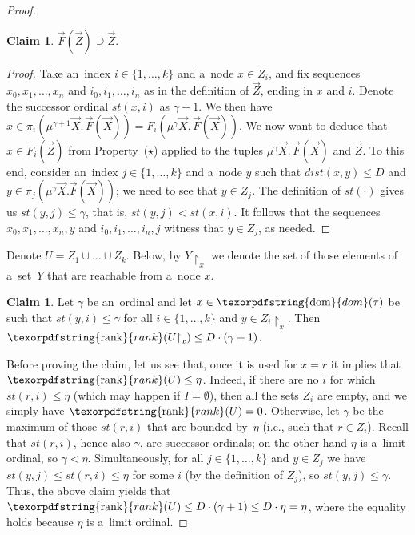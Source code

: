 \documentclass[11pt,a4paper]{amsart}
\theoremstyle{plain}
\theoremstyle{definition}
\newtheorem{clm}[thm]{Claim}
\theoremstyle{defC}
\theoremstyle{thmC}
\theoremstyle{plain}
\numberwithin{equation}{section}
\numberwithin{equation}{section}
\numberwithin{figure}{section}
\newcommand{\ident}[1]{\ensuremath{\texorpdfstring{\mathrm{\mathnm{#1}}}{#1}}\xspace}
\newcommand{\dom}{\ident{dom}}
\newcommand{\mathnm}[1]{#1}
\newcommand{\restr}{{\upharpoonright}}
\newcommand{\rank}{\ident{rank}}
\newcommand{\dist}{\mathit{dist}}
\newcommand{\stab}{\mathit{st}}
\begin{document}
\begin{proof}
	\begin{clm}
		$\vec{F}(\vec{Z})\supseteq\vec{Z}$.
	\end{clm}

	\begin{proof}
		Take an~index $i\in\{1,\dots,k\}$ and a~node $x\in Z_i$, and fix sequences $x_0,x_1,\dots,x_n$ and $i_0,i_1,\dots,i_n$ as in the definition of $\vec{Z}$, ending in $x$ and $i$.
		Denote the successor ordinal $\stab(x,i)$ as $\gamma+1$.
		We then have $x\in\pi_i(\mu^{\gamma+1}\vec{X}.\,\vec{F}(\vec{X}))=F_i(\mu^\gamma\vec{X}.\,\vec{F}(\vec{X}))$.
		We now want to deduce that $x\in F_i(\vec{Z})$ from Property~($\star$) applied to the tuples $\mu^\gamma\vec{X}.\,\vec{F}(\vec{X})$ and $\vec{Z}$.
		To this end, consider an~index $j\in\{1,\dots,k\}$ and a~node $y$ such that $\dist(x,y)\leq D$ and $y\in\pi_j(\mu^\gamma\vec{X}.\vec{F}(\vec{X}))$;
		we need to see that $y\in Z_j$.
		The definition of $\stab(\cdot)$ gives us $\stab(y,j)\leq\gamma$, that is, $\stab(y,j)<\stab(x,i)$.
		It follows that the sequences $x_0,x_1,\dots,x_n,y$ and $i_0,i_1,\dots,i_n,j$ witness that $y\in Z_j$, as needed.
	\end{proof}
	
	Denote $U=Z_1\cup\dots\cup Z_k$.
	Below, by $Y\restr_x$ we denote the set of those elements of a~set~$Y$ that are reachable from a~node $x$.
	
	\begin{clm}\label{clm:2}
		Let $\gamma$ be an~ordinal and let $x\in\dom(\tau)$ be such that $\stab(y,i)\leq\gamma$ for all $i\in\{1,\dots,k\}$ and $y\in Z_i\restr_x$.
		Then $\rank(U\restr_x)\leq D\cdot(\gamma+1)$.
	\end{clm}
		
	Before proving the claim, let us see that, once it is used for $x=r$ it implies that $\rank(U)\leq\eta$.
	Indeed, if there are no $i$ for which $\stab(r,i)\leq\eta$ (which may happen if $I=\emptyset$), then all the sets $Z_i$ are empty, and we simply have $\rank(U)=0$.
	Otherwise, let $\gamma$ be the maximum of those $\stab(r,i)$ that are bounded by~$\eta$ (i.e., such that $r\in Z_i$).
	Recall that $\stab(r,i)$, hence also $\gamma$, are successor ordinals; on the other hand $\eta$ is a~limit ordinal, so $\gamma<\eta$.
	Simultaneously, for all $j\in\{1,\dots,k\}$ and $y\in Z_j$ we have $\stab(y,j)\leq\stab(r,i)\leq\eta$ for some $i$ (by the definition of $Z_j$), so $\stab(y,j)\leq\gamma$.
	Thus, the above claim yields that $\rank(U)\leq D\cdot(\gamma+1)\leq D\cdot\eta=\eta$, where the equality holds because $\eta$ is a~limit ordinal.
	

\end{proof}
\end{document}
